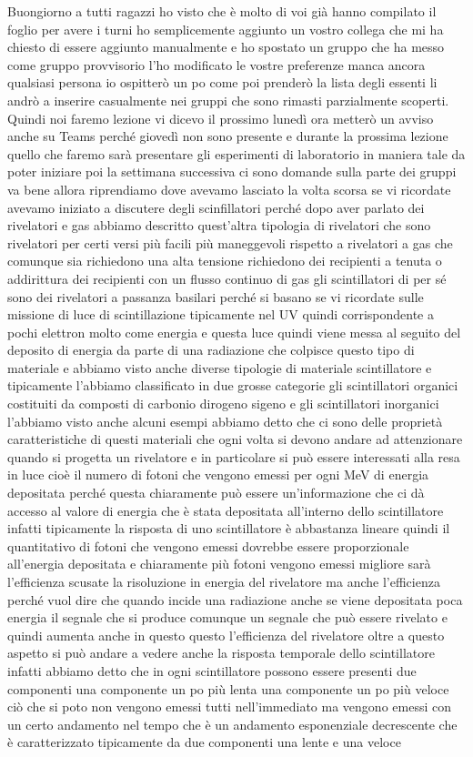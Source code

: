 {Buongiorno a tutti ragazzi ho visto che è molto di voi già hanno compilato il foglio per avere i turni ho semplicemente aggiunto un vostro collega che mi ha chiesto di essere aggiunto manualmente e ho spostato un gruppo che ha messo come gruppo provvisorio l'ho modificato le vostre preferenze manca ancora qualsiasi persona io ospitterò un po come poi prenderò la lista degli essenti li andrò a inserire casualmente nei gruppi che sono rimasti parzialmente scoperti. Quindi noi faremo lezione vi dicevo il prossimo lunedì ora metterò un avviso anche su Teams perché giovedì non sono presente e durante la prossima lezione quello che faremo sarà presentare gli esperimenti di laboratorio in maniera tale da poter iniziare poi la settimana successiva ci sono domande sulla parte dei gruppi va bene allora riprendiamo dove avevamo lasciato la volta scorsa se vi ricordate avevamo iniziato a discutere degli scinfillatori perché dopo aver parlato dei rivelatori e gas abbiamo descritto quest'altra tipologia di rivelatori che sono rivelatori per certi versi più facili più maneggevoli rispetto a rivelatori a gas che comunque sia richiedono una alta tensione richiedono dei recipienti a tenuta o addirittura dei recipienti con un flusso continuo di gas gli scintillatori di per sé sono dei rivelatori a passanza basilari perché si basano se vi ricordate sulle missione di luce di scintillazione tipicamente nel UV quindi corrispondente a pochi elettron molto come energia e questa luce quindi viene messa al seguito del deposito di energia da parte di una radiazione che colpisce questo tipo di materiale e abbiamo visto anche diverse tipologie di materiale scintillatore e tipicamente l'abbiamo classificato in due grosse categorie gli scintillatori organici costituiti da composti di carbonio dirogeno sigeno e gli scintillatori inorganici l'abbiamo visto anche alcuni esempi abbiamo detto che ci sono delle proprietà caratteristiche di questi materiali che ogni volta si devono andare ad attenzionare quando si progetta un rivelatore e in particolare si può essere interessati alla resa in luce cioè il numero di fotoni che vengono emessi per ogni MeV di energia depositata perché questa chiaramente può essere un'informazione che ci dà accesso al valore di energia che è stata depositata all'interno dello scintillatore infatti tipicamente la risposta di uno scintillatore è abbastanza lineare quindi il quantitativo di fotoni che vengono emessi dovrebbe essere proporzionale all'energia depositata e chiaramente più fotoni vengono emessi migliore sarà l'efficienza scusate la risoluzione in energia del rivelatore ma anche l'efficienza perché vuol dire che quando incide una radiazione anche se viene depositata poca energia il segnale che si produce comunque un segnale che può essere rivelato e quindi aumenta anche in questo questo l'efficienza del rivelatore oltre a questo aspetto si può andare a vedere anche la risposta temporale dello scintillatore infatti abbiamo detto che in ogni scintillatore possono essere presenti due componenti una componente un po più lenta una componente un po più veloce ciò che si poto non vengono emessi tutti nell'immediato ma vengono emessi con un certo andamento nel tempo che è un andamento esponenziale decrescente che è caratterizzato tipicamente da due componenti una lente e una veloce }
